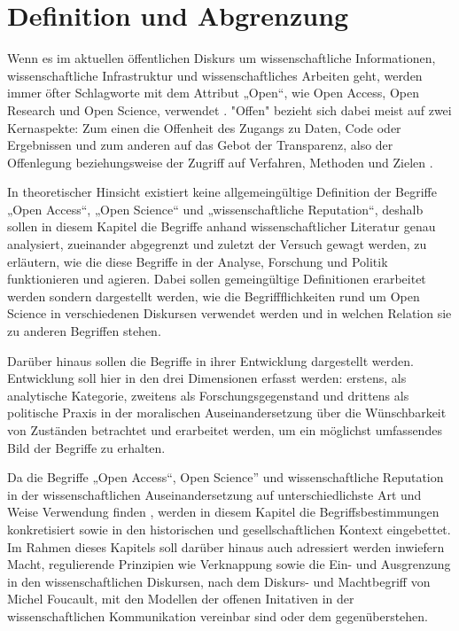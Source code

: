 \chapter{Definition und Abgrenzung} 
Wenn es im aktuellen öffentlichen Diskurs um wissenschaftliche Informationen, wissenschaftliche Infrastruktur und wissenschaftliches Arbeiten geht, werden immer öfter Schlagworte mit dem Attribut „Open“, wie Open Access, Open Research und Open Science, verwendet \cite{bunz_2014} \cite{schulze_2013_open}. "Offen" bezieht sich dabei meist auf zwei Kernaspekte: Zum einen die Offenheit des Zugangs zu Daten, Code oder Ergebnissen und zum anderen auf das Gebot der Transparenz, also der Offenlegung beziehungsweise der Zugriff auf Verfahren, Methoden und Zielen \cite{schulze_2013_open}.

In theoretischer Hinsicht existiert keine allgemeingültige Definition der Begriffe „Open Access“, „Open Science“ und „wissenschaftliche Reputation“, deshalb sollen in diesem Kapitel die Begriffe anhand wissenschaftlicher Literatur genau analysiert, zueinander abgegrenzt und zuletzt der Versuch gewagt werden, zu erläutern, wie die diese Begriffe in der Analyse, Forschung und Politik funktionieren und agieren. Dabei sollen gemeingültige Definitionen erarbeitet werden sondern dargestellt werden, wie die Begriffflichkeiten rund um Open Science in verschiedenen Diskursen verwendet werden und in welchen Relation sie zu anderen Begriffen stehen.

Darüber hinaus sollen die Begriffe in ihrer Entwicklung dargestellt werden. Entwicklung soll hier in den drei Dimensionen erfasst werden: erstens, als analytische Kategorie, zweitens als Forschungsgegenstand und drittens als politische Praxis in der moralischen Auseinandersetzung über die Wünschbarkeit von Zuständen betrachtet und erarbeitet werden, um ein möglichst umfassendes Bild der Begriffe zu erhalten. \cite{cite:10}

Da die Begriffe „Open Access“, Open Science” und wissenschaftliche Reputation in der wissenschaftlichen Auseinandersetzung auf unterschiedlichste Art und Weise Verwendung finden \cite{cite:9}, werden in diesem Kapitel die Begriffsbestimmungen konkretisiert sowie in den historischen und gesellschaftlichen Kontext eingebettet. Im Rahmen dieses Kapitels soll darüber hinaus auch adressiert werden inwiefern Macht, regulierende Prinzipien wie Verknappung sowie die Ein- und Ausgrenzung in den wissenschaftlichen Diskursen, nach dem Diskurs- und Machtbegriff  von Michel Foucault, mit den Modellen der offenen Initativen in der wissenschaftlichen Kommunikation vereinbar sind oder dem gegenüberstehen.

